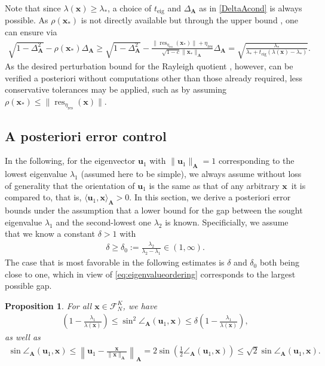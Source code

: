\documentclass[a4paper,11pt,oneside]{amsart}
\newtheorem{prop}[theorem]{Proposition}
\theoremstyle{definition}
\theoremstyle{remark}
\newcommand{\A}{\ten A}
\newcommand{\ten}[1]{\boldsymbol{#1}}
\newcommand{\etares}{\eta_{\mathrm{res}}}
\newcommand{\teig}{t_{\mathrm{eig}}}
\numberwithin{equation}{section}
\numberwithin{theorem}{section}
\begin{document}
Note that since $\lambda(\ten x) \geq \lambda_*$, a choice of $\teig$ and $\Delta_{\ten A}$ as in \eqref{DeltaAcond} is always possible. 
As $\rho(\ten x_\ast)$ is not directly available but through the upper bound , one can ensure  via
\begin{align*}
  \sqrt{1-\Delta_{\ten A}^2} - \rho(\ten x_\ast) \Delta_{\ten A} \geq 
  \sqrt{1-\Delta_{\ten A}^2} -  \frac{\|\operatorname{res}_{\etares}(\ten x_\ast)\| + \etares}{ \sqrt{ 1 - c} \|\ten x_\ast\|_{\A}} \Delta_{\ten A} =\sqrt{ \frac{\lambda_\ast}{\lambda_\ast + \teig (\lambda(\ten x) - \lambda_\ast)} }.
\end{align*}
As the desired perturbation bound for the Rayleigh quotient , however, can be verified a posteriori without computations other than those already required, less conservative tolerances may be applied, such as by assuming $\rho(\ten x_\ast) \leq \|\operatorname{res}_{\etares}(\ten x)\|$.


\subsection{A posteriori error control}\label{sec:aposerrcon}
%
In the following, for the eigenvector $\ten{u}_1$ with $\|\ten u_1\|_{\A} = 1$ corresponding to the lowest eigenvalue $\lambda_1$ (assumed here to be simple), we always assume without loss of generality that the orientation of $\ten{u}_1$ is the same as that of any arbitrary $\ten x$\ it is compared to, that is, $ \langle \ten u_1, \ten x \rangle_{\ten A} > 0$. In this section, we derive a posteriori error bounds under the assumption that a lower bound for the gap between the sought eigenvalue $\lambda_1$ and the second-lowest one $\lambda_2$ is known.
Specificially, we assume that we know a constant $\delta > 1$ with
\begin{align*}
 \delta \geq \delta_0 := \frac{\lambda_2}{\lambda_2 - \lambda_1} \in (1,\infty).
\end{align*}
The case that is most favorable in the following estimates is $\delta$ and $\delta_0$ both being close to one, which in view of \eqref{eq:eigenvalueordering} corresponds to the largest possible gap.

\begin{prop}\label{raylangleb} 
For all $\ten x \in \mathcal{F}_N^K$, we have
\begin{align}\label{eq:sinbound}
 \left( 1 - \frac{\lambda_1}{\lambda(\ten x)} \right) \leq \sin^2 \angle_{\ten A}(\ten{u}_1,\ten x) \leq 
   \delta \left( 1 - \frac{\lambda_1}{\lambda(\ten x)} \right),
\end{align}
as well as
\begin{align}\label{eq:2ndsinbound}
  \sin \angle_{\ten A}(\ten{u}_1,\ten x) \leq \left\|\ten{u}_1 - \frac{\ten x}{\|\ten x\|_{\A}} \right\|_{\A} = 2 \sin \left(\frac{1}{2} \angle_{\A}(\ten{u}_1,\ten x) \right)  \leq \sqrt{2} \sin \angle_{\ten A}(\ten{u}_1,\ten x).
\end{align}
\end{prop}
\end{document}
